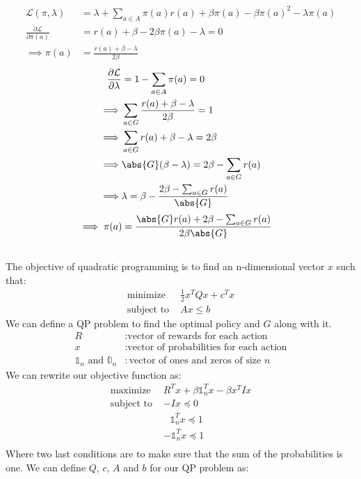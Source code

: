 \documentclass{article}
\begin{document}
\subsection{}
\begin{align*}
\mathcal{L}(\pi, \lambda) &= \lambda + \sum_{a \in A} \pi(a) r(a) + \beta \pi(a) - \beta \pi(a)^2 - \lambda \pi(a)\\
\frac{\partial \mathcal{L}}{\partial \pi(a)} &= r(a) + \beta - 2\beta \pi(a) - \lambda = 0\\
\implies \pi(a) &= \frac{r(a) + \beta - \lambda}{2\beta}
\end{align*}
\begin{align*}
\frac{\partial \mathcal{L}}{\partial \lambda} &= 1 - \sum_{a \in A} \pi(a) = 0\\
\implies& \sum_{a \in G} \frac{r(a) + \beta - \lambda}{2\beta} = 1\\
\implies& \sum_{a \in G} r(a) + \beta - \lambda = 2\beta\\
\implies&  \abs{G} (\beta - \lambda) = 2\beta - \sum_{a \in G} r(a)\\
\implies& \lambda = \beta - \frac{2\beta - \sum_{a \in G} r(a)}{\abs{G}}
\end{align*}
\begin{align*}
\implies \pi(a) &= \frac{\abs{G} r(a) + 2\beta - \sum_{a \in G} r(a)}{2\beta \abs{G}}
\end{align*}

\subsection{}
The objective of quadratic programming is to find an n-dimensional vector \(x\) such that:
\begin{align*}
\text{minimize }& \frac{1}{2} x^T Q x + c^T x\\
\text{subject to }& Ax \le b    
\end{align*}
We can define a QP problem to find the optimal policy and \(G\) along with it.
\begin{align*}
R&: \text{vector of rewards for each action}\\
x&: \text{vector of probabilities for each action}\\
\mathbb{1}_n \text{ and }\mathbb{0}_n&: \text{vector of ones and zeros of size } n
\end{align*}
We can rewrite our objective function as:
\begin{align*}
\text{maximize }& R^T x + \beta \mathbb{1}_n^T x - \beta x^T I x\\
\text{subject to }& - I x \preceq 0\\
& \ \ \  \mathbb{1}_n^T x \preceq 1\\
& - \mathbb{1}_n^T x \preceq 1\\
\end{align*}
Where two last conditions are to make sure that the sum of the probabilities is one.
We can define \(Q\), \(c\), \(A\) and \(b\) for our QP problem as:
\end{document}
